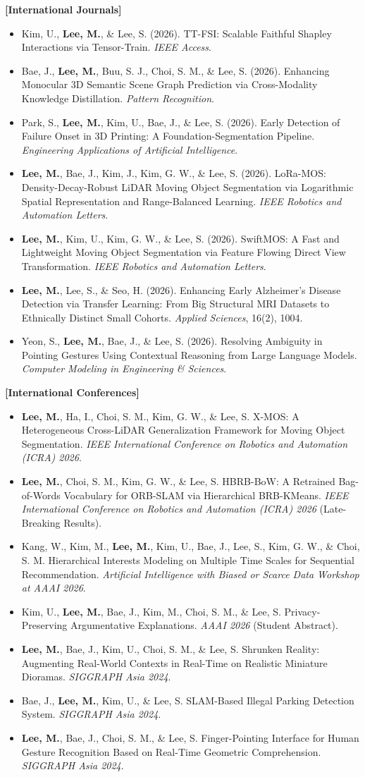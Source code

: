 \documentclass[letterpaper,11pt]{article}
\newcommand{\resumeItem}[1]{
  \item\small{
    {#1 \vspace{0pt}}
  }
}
\newcommand{\resumeSubHeadingListStart}{\begin{itemize}[leftmargin=*]}
\newcommand{\resumeSubHeadingListEnd}{\end{itemize}}
\begin{document}
\vspace{4pt}
\textbf{[International Journals]}
\resumeSubHeadingListStart
\resumeItem{Kim, U., \textbf{Lee, M.}, \& Lee, S. (2026). TT-FSI: Scalable Faithful Shapley Interactions via Tensor-Train. \textit{IEEE Access}.}
\resumeItem{Bae, J., \textbf{Lee, M.}, Buu, S. J., Choi, S. M., \& Lee, S. (2026). Enhancing Monocular 3D Semantic Scene Graph Prediction via Cross-Modality Knowledge Distillation. \textit{Pattern Recognition}.}
\resumeItem{Park, S., \textbf{Lee, M.}, Kim, U., Bae, J., \& Lee, S. (2026). Early Detection of Failure Onset in 3D Printing: A Foundation-Segmentation Pipeline. \textit{Engineering Applications of Artificial Intelligence}.}
\resumeItem{\textbf{Lee, M.}, Bae, J., Kim, J., Kim, G. W., \& Lee, S. (2026). LoRa-MOS: Density-Decay-Robust LiDAR Moving Object Segmentation via Logarithmic Spatial Representation and Range-Balanced Learning. \textit{IEEE Robotics and Automation Letters}.}
\resumeItem{\textbf{Lee, M.}, Kim, U., Kim, G. W., \& Lee, S. (2026). SwiftMOS: A Fast and Lightweight Moving Object Segmentation via Feature Flowing Direct View Transformation. \textit{IEEE Robotics and Automation Letters}.}
\resumeItem{\textbf{Lee, M.}, Lee, S., \& Seo, H. (2026). Enhancing Early Alzheimer's Disease Detection via Transfer Learning: From Big Structural MRI Datasets to Ethnically Distinct Small Cohorts. \textit{Applied Sciences}, 16(2), 1004.}
\resumeItem{Yeon, S., \textbf{Lee, M.}, Bae, J., \& Lee, S. (2026). Resolving Ambiguity in Pointing Gestures Using Contextual Reasoning from Large Language Models. \textit{Computer Modeling in Engineering \& Sciences}.}
\resumeSubHeadingListEnd

\textbf{[International Conferences]}
\resumeSubHeadingListStart
\resumeItem{\textbf{Lee, M.}, Ha, I., Choi, S. M., Kim, G. W., \& Lee, S. X-MOS: A Heterogeneous Cross-LiDAR Generalization Framework for Moving Object Segmentation. \textit{IEEE International Conference on Robotics and Automation (ICRA) 2026}.}
\resumeItem{\textbf{Lee, M.}, Choi, S. M., Kim, G. W., \& Lee, S. HBRB-BoW: A Retrained Bag-of-Words Vocabulary for ORB-SLAM via Hierarchical BRB-KMeans. \textit{IEEE International Conference on Robotics and Automation (ICRA) 2026} (Late-Breaking Results).}
\resumeItem{Kang, W., Kim, M., \textbf{Lee, M.}, Kim, U., Bae, J., Lee, S., Kim, G. W., \& Choi, S. M. Hierarchical Interests Modeling on Multiple Time Scales for Sequential Recommendation. \textit{Artificial Intelligence with Biased or Scarce Data Workshop at AAAI 2026}.}
\resumeItem{Kim, U., \textbf{Lee, M.}, Bae, J., Kim, M., Choi, S. M., \& Lee, S. Privacy-Preserving Argumentative Explanations. \textit{AAAI 2026} (Student Abstract).}
\resumeItem{\textbf{Lee, M.}, Bae, J., Kim, U., Choi, S. M., \& Lee, S. Shrunken Reality: Augmenting Real-World Contexts in Real-Time on Realistic Miniature Dioramas. \textit{SIGGRAPH Asia 2024}.}
\resumeItem{Bae, J., \textbf{Lee, M.}, Kim, U., \& Lee, S. SLAM-Based Illegal Parking Detection System. \textit{SIGGRAPH Asia 2024}.}
\resumeItem{\textbf{Lee, M.}, Bae, J., Choi, S. M., \& Lee, S. Finger-Pointing Interface for Human Gesture Recognition Based on Real-Time Geometric Comprehension. \textit{SIGGRAPH Asia 2024}.}
\resumeSubHeadingListEnd
\end{document}
